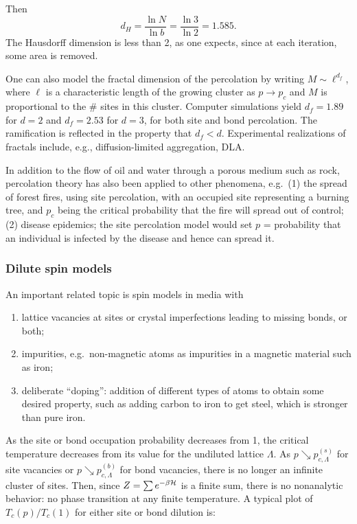 Then
\begin{equation}
  d_H = \frac{\ln N}{\ln b} = \frac{\ln 3}{\ln 2} = 1.585 .
\end{equation}
The Hausdorff dimension is less than 2, as one expects, since at each iteration, some area is removed.

One can also model the fractal dimension of the percolation by writing $M\sim\ell^{d_f}$, where $\ell$ is a characteristic
length of the growing cluster as $p\to p_c$ and $M$ is proportional to the \# sites in this cluster. Computer simulations
yield $d_f = 1.89$ for $d = 2$ and $d_f = 2.53$ for $d = 3$, for both site and bond percolation. The ramification is
reflected in the property that $d_f<d$. Experimental realizations of fractals include, e.g., diffusion-limited aggregation,
DLA.

In addition to the flow of oil and water through a porous medium such as rock, percolation theory has also been applied to
other phenomena, e.g.\
(1) the spread of forest fires, using site percolation, with an occupied site representing a burning tree, and $p_c$ being the
critical probability that the fire will spread out of control;
(2) disease epidemics; the site percolation model would set $p$ = probability that an individual is infected by the disease and
hence can spread it.

\subsubsection*{Dilute spin models}

An important related topic is spin models in media with
\begin{enumerate}[label=(\roman*)]
  \item lattice vacancies at sites or crystal imperfections leading to missing bonds, or both;
  \item impurities, e.g.\ non-magnetic atoms as impurities in a magnetic material such as iron;
  \item deliberate ``doping'': addition of different types of atoms to obtain some desired property, such as adding carbon to
    iron to get steel, which is stronger than pure iron.
\end{enumerate}
As the site or bond occupation probability decreases from 1, the critical temperature decreases from its value for the
undiluted lattice $\Lambda$. As $p\searrow p_{c,\Lambda}^{(s)}$ for site vacancies or $p\searrow p_{c,\Lambda}^{(b)}$ for
bond vacancies, there is no longer an infinite cluster of sites. Then, since $Z = \sum e^{-\beta\mathcal{H}}$ is a finite sum, there
is no nonanalytic behavior: no phase transition at any finite temperature. A typical plot of $T_c(p)/T_c(1)$ for either site
or bond dilution is:

